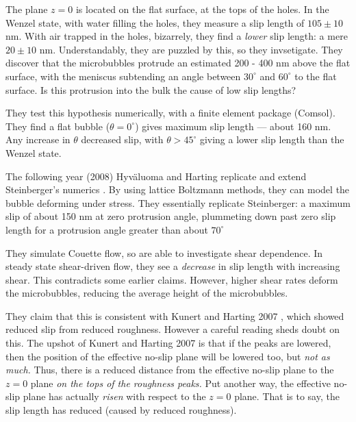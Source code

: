 \documentclass[a4paper]{report}
\begin{document}
The plane $z=0$ is located on the flat surface, at the tops of the holes.  In the Wenzel state, with water filling the holes, they measure a slip length of $105 \pm 10$ nm.  With air trapped in the holes, bizarrely, they find a \emph{lower} slip length: a mere $20 \pm 10$ nm.  Understandably, they are puzzled by this, so they invsetigate.  They discover that the microbubbles protrude an estimated 200 - 400 nm above the flat surface, with the meniscus subtending an angle between $30^{\circ}$ and $60^{\circ}$ to the flat surface.  Is this protrusion into the bulk the cause of low slip lengths?

They test this hypothesis numerically, with a finite element package (Comsol).  They find a flat bubble ($\theta = 0^{\circ}$) gives maximum slip length --- about 160 nm.  Any increase in $\theta$ decreased slip, with $\theta > 45^{\circ}$ giving a lower slip length than the Wenzel state.

The following year (2008) Hyv\"{a}luoma and Harting replicate and extend Steinberger's numerics \cite{HyvaluomaHarting2008}.  By using lattice Boltzmann methods, they can model the bubble deforming under stress.  They essentially replicate Steinberger: a maximum slip of about 150 nm at zero protrusion angle, plummeting down past zero slip length for a protrusion angle greater than about $70^{\circ}$

They simulate Couette flow, so are able to investigate shear dependence.  In steady state shear-driven flow, they see a \emph{decrease} in slip length with increasing shear.  This contradicts some earlier claims.  However, higher shear rates deform the microbubbles, reducing the average height of the microbubbles.

They claim that this is consistent with Kunert and Harting 2007 \cite{KunertHarting2007}, which showed reduced slip from reduced roughness.
However a careful reading sheds doubt on this. The upshot of Kunert and Harting 2007 \cite{KunertHarting2007} is that if the peaks are lowered, then the position of the effective no-slip plane will be lowered too, but \emph{not as much.}  Thus, there is a reduced distance from the effective no-slip plane to the $z=0$ plane \emph{on the tops of the roughness peaks.} Put another way, the effective no-slip plane has actually \emph{risen} with respect to the $z=0$ plane. That is to say, the slip length has reduced (caused by reduced roughness).  
\end{document}

